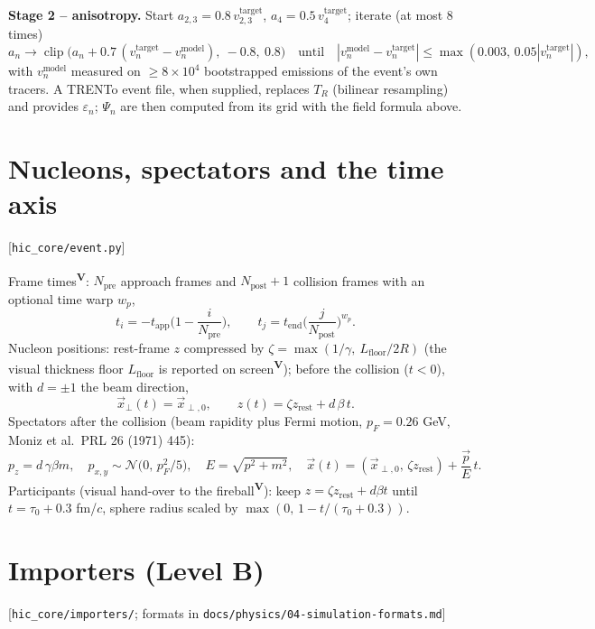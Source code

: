 \documentclass[11pt,a4paper]{article}
\newcommand{\file}[1]{\texttt{\small #1}}
\newcommand{\src}[1]{\hfill{\small\color{gray}[#1]}}
\newcommand{\vis}{\textsuperscript{\color{blue!70!black}\textbf{V}}}
\begin{document}
\textbf{Stage 2 -- anisotropy.} Start $a_{2,3}=0.8\,v^\text{target}_{2,3}$, $a_4 = 0.5\,v_4^\text{target}$;
iterate (at most 8 times)
\begin{equation}
a_n \to \operatorname{clip}\big(a_n + 0.7\,(v_n^\text{target}-v_n^\text{model}),\ -0.8,\ 0.8\big)
\quad\text{until}\quad |v_n^\text{model}-v_n^\text{target}|\le\max(0.003,\,0.05|v_n^\text{target}|),
\end{equation}
with $v_n^\text{model}$ measured on $\ge8\times10^4$ bootstrapped emissions of the event's own tracers.
A TRENTo event file, when supplied, replaces $T_R$ (bilinear resampling) and provides $\varepsilon_n$; $\Psi_n$ are then
computed from its grid with the field formula above.

\section{Nucleons, spectators and the time axis}
\src{\file{hic\_core/event.py}}

Frame times\vis: $N_\text{pre}$ approach frames and $N_\text{post}+1$ collision frames with an optional time warp $w_p$,
\begin{equation}
t_i = -t_\text{app}\Big(1-\frac{i}{N_\text{pre}}\Big),\qquad
t_j = t_\text{end}\Big(\frac{j}{N_\text{post}}\Big)^{w_p}.
\end{equation}
Nucleon positions: rest-frame $z$ compressed by $\zeta = \max(1/\gamma,\ L_\text{floor}/2R)$ (the visual thickness floor
$L_\text{floor}$ is reported on screen\vis); before the collision ($t<0$), with $d=\pm1$ the beam direction,
\begin{equation}
\vec x_\perp(t) = \vec x_{\perp,0},\qquad z(t) = \zeta z_\text{rest} + d\,\beta\,t .
\end{equation}
Spectators after the collision (beam rapidity plus Fermi motion, $p_F=0.26$ GeV, Moniz et al.\ PRL 26 (1971) 445):
\begin{equation}
p_z = d\,\gamma\beta m,\quad p_{x,y}\sim\mathcal N\!\big(0,\,p_F^2/5\big),\quad E=\sqrt{p^2+m^2},\quad
\vec x(t) = (\vec x_{\perp,0},\,\zeta z_\text{rest}) + \frac{\vec p}{E}\,t .
\end{equation}
Participants (visual hand-over to the fireball\vis): keep $z = \zeta z_\text{rest}+d\beta t$ until $t = \tau_0+0.3$ fm/$c$,
sphere radius scaled by $\max(0,\,1-t/(\tau_0+0.3))$.

\section{Importers (Level B)}
\src{\file{hic\_core/importers/}; formats in \file{docs/physics/04-simulation-formats.md}}
\end{document}
